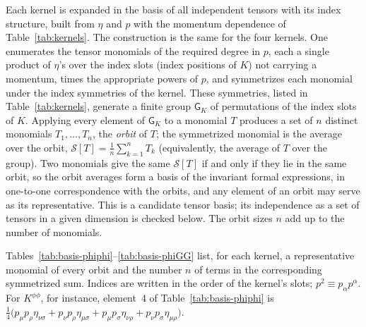 \documentclass[prd,aps,preprint,superscriptaddress,nofootinbib,amsmath,amssymb,eqsecnum]{revtex4-2}
\begin{document}
Each kernel is expanded in the basis of all independent tensors with its index structure,
built from $\eta$ and $p$ with the momentum dependence of Table~\ref{tab:kernels}. The
construction is the same for the four kernels. One enumerates the tensor monomials of the
required degree in $p$, each a single product of $\eta$'s over the index slots (index
positions of $K$) not carrying a
momentum, times the appropriate powers of $p$, and symmetrizes each monomial under the
index symmetries of the kernel. These symmetries, listed in Table~\ref{tab:kernels}, generate
a finite group $\mathsf{G}_K$ of permutations of the index slots of $K$. Applying every
element of $\mathsf{G}_K$ to a monomial $T$ produces a set of $n$ distinct monomials
$T_1,\dots,T_n$, the \emph{orbit} of $T$; the symmetrized monomial is the average over the
orbit, $\mathcal{S}[T]=\frac1n\sum_{k=1}^{n}T_k$ (equivalently, the average of $T$ over the
group). Two monomials give the same $\mathcal{S}[T]$ if and only if they lie in the same
orbit, so the orbit averages form a basis of the invariant formal expressions, in
one-to-one correspondence with the orbits, and any element of an orbit may serve as its
representative. This is a candidate tensor basis; its independence as a set of tensors in a
given dimension is checked below. The orbit sizes $n$ add up to the number of monomials.

Tables~\ref{tab:basis-phiphi}--\ref{tab:basis-phiGG} list, for each kernel, a representative
monomial of every orbit and the number $n$ of terms in the corresponding symmetrized sum.
Indices are written in the order of the kernel's slots; $p^2\equiv p_\alpha p^\alpha$. For
$K^{\phi\phi}$, for instance, element~4 of Table~\ref{tab:basis-phiphi} is
$\tfrac14\big(p_\mu p_\rho\eta_{\nu\sigma}+p_\nu p_\rho\eta_{\mu\sigma}
+p_\mu p_\sigma\eta_{\nu\rho}+p_\nu p_\sigma\eta_{\mu\rho}\big)$.
\end{document}
